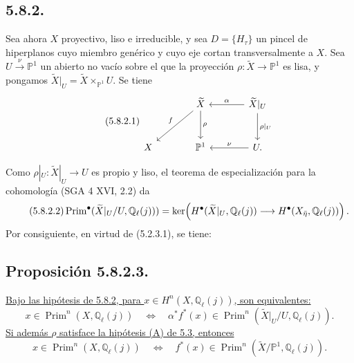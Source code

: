 \subsection*{5.8.2.}
Sea ahora $X$ proyectivo, liso e irreducible, y sea $D=\{H_\tau\}$ un
pincel de hiperplanos cuyo miembro genérico y cuyo eje cortan
transversalmente a $X$. Sea
$U\xrightarrow{\nu}\mathbb P^1$ un abierto no vacío sobre el que la
proyección $\rho:\widetilde X\to\mathbb P^1$ es lisa, y pongamos
$\widetilde X|_U=\widetilde X\times_{\mathbb P^1}U$. Se tiene
\begin{equation}\tag{5.8.2.1}
\begin{tikzcd}[column sep=large,row sep=large]
{}
&
\widetilde X
  \arrow[dl,"f"']
  \arrow[d,"\rho"]
&
\widetilde X|_U
  \arrow[l,"\alpha"']
  \arrow[d,"\rho|_U"]
\\
X
&
\mathbb P^1
&
U\arrow[l,"\nu"'].
\end{tikzcd}
\end{equation}

\pageoriginale

Como $\rho|_U:\widetilde X|_U\to U$ es propio y liso, el teorema de
especialización para la cohomología (SGA 4 XVI, 2.2) da
\begin{equation}\tag{5.8.2.2}
\operatorname{Prim}^\bullet(\widetilde X|_U/U,\mathbb Q_\ell(j)))
=\ker\!\left(
H^\bullet(\widetilde X|_U,\mathbb Q_\ell(j))
\longrightarrow H^\bullet(X_{\bar\eta},\mathbb Q_\ell(j))
\right).
\end{equation}
Por consiguiente, en virtud de (5.2.3.1), se tiene:

\subsection*{Proposición 5.8.2.3.}
\underline{Bajo las hipótesis de 5.8.2, para
$x\in H^n(X,\mathbb Q_\ell(j))$, son equivalentes:}
\begin{equation}\tag{5.8.2.4}
x\in\operatorname{Prim}^n(X,\mathbb Q_\ell(j))
\quad\Longleftrightarrow\quad
\alpha^*f^*(x)\in
\operatorname{Prim}^n(\widetilde X|_U/U,\mathbb Q_\ell(j)).
\end{equation}
\underline{Si además $\rho$ satisface la hipótesis (A) de 5.3,
entonces}
\begin{equation}\tag{5.8.2.5}
x\in\operatorname{Prim}^n(X,\mathbb Q_\ell(j))
\quad\Longleftrightarrow\quad
f^*(x)\in
\operatorname{Prim}^n(\widetilde X/\mathbb P^1,\mathbb Q_\ell(j)).
\end{equation}

